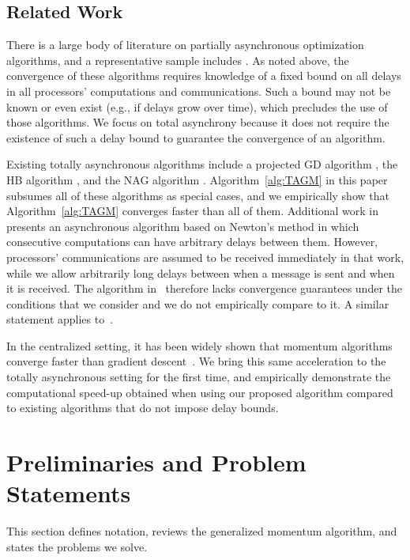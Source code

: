 \documentclass[9pt,shortpaper,twoside,web]{ieeecolor}
\newcommand{\blue}[1]{{\textcolor{blue}{#1}}}
\begin{document}
\subsection{Related Work}
There is a large body of literature on partially asynchronous optimization algorithms, and a representative sample includes \cite{tian2020asynchronous,zhou2018distributed,assran2020,chang2016,tseng1991rate,tseng1990network,tian2018linear,nedic2001,hsieh2022,sun2017real,magnusson2020,tsianos2011}. 
As noted above, the convergence of these algorithms requires knowledge
of a fixed bound on all delays in all processors' computations and communications. 
Such a bound may not be known or even exist (e.g., if delays grow over time), which 
precludes the use of those algorithms.
We focus on total asynchrony because it does not require the existence of such a delay bound to guarantee the convergence of an algorithm.

Existing totally asynchronous algorithms include 
a projected GD algorithm \cite{bertsekas1989parallel}, the HB algorithm \cite{hustig2023totally}, and 
the NAG algorithm \cite{pond2024}. 
Algorithm~\ref{alg:TAGM} in this paper subsumes all of these algorithms as special cases, and
we empirically show that Algorithm~\ref{alg:TAGM} converges faster
than all of them. 
Additional work in~\cite{mansoori2019fast} presents an asynchronous algorithm
based on Newton's method
in which consecutive computations can have arbitrary delays
between them. However, processors' communications are assumed
to be received immediately in that work, while 
we allow arbitrarily long delays between when a message is sent
and when it is received. 
The algorithm in~\cite{mansoori2019fast} therefore lacks convergence guarantees under
the conditions that we consider and we do not empirically compare to it. 
A similar statement applies to~\cite{srivastava2011}. 

In the centralized setting,
it has been widely shown that momentum algorithms converge faster than gradient 
descent~\cite{haji2021comparison,qian1999momentum,vanscoy2018,drori2014performance,su2016,saab2022adaptive,sun2019}. 
We bring this same acceleration to the totally asynchronous setting for the first time, and empirically demonstrate the computational speed-up obtained when using our proposed algorithm compared to existing algorithms that do not impose delay bounds.


\section{Preliminaries and Problem Statements}
This section defines notation, reviews the generalized momentum algorithm, and states the problems 
we solve.
\end{document}
